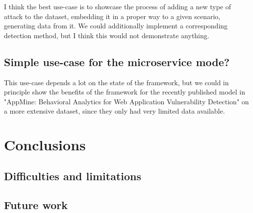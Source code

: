 \documentclass{article}
\begin{document}
I think the best use-case is to showcase the process of adding a new type of attack to the dataset, embedding it in a proper way to a given scenario, generating data from it. We could additionally implement a corresponding detection method, but I think this would not demonstrate anything. 


\subsection{Simple use-case for the microservice mode?}
This use-case depends a lot on the state of the framework, but we could in principle show the benefits of the framework for the recently published model in "AppMine: Behavioral Analytics for Web Application Vulnerability Detection" on a more extensive dataset, since they only had very limited data available. 
\section{Conclusions}\label{Sec:Conclusion}



\subsection{Difficulties and limitations}


\subsection{Future work}









 


\end{document}
